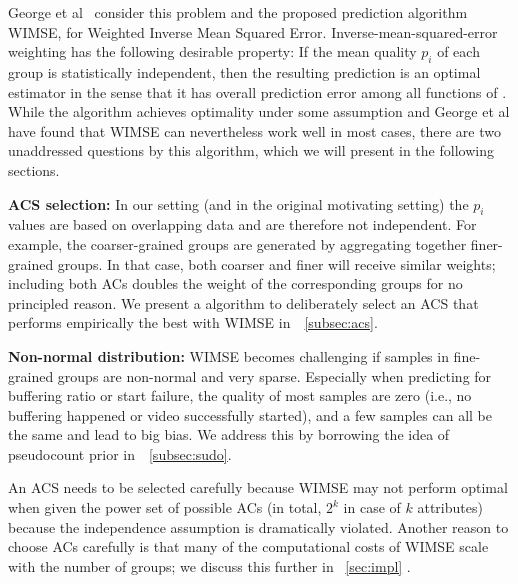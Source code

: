 George et al~\cite{george2008value} consider this problem and the proposed prediction algorithm WIMSE, for Weighted Inverse Mean Squared Error.  Inverse-mean-squared-error weighting has the following desirable property: If the mean quality $p_i$ of each group is statistically independent, then the resulting prediction is an optimal estimator in the sense that it has overall prediction error among all functions of \cite{george2008value}.
While the algorithm achieves optimality under some assumption and George et al have found that WIMSE can nevertheless work well in most cases, there are two unaddressed questions by this algorithm, which we will present in the following sections.
\begin{packeditemize}
	\item {\bf ACS selection:} In our setting (and in the original motivating setting) the $p_i$ values are based on overlapping data and are therefore not independent. For example, the coarser-grained groups are generated by aggregating together finer-grained groups. In that case, both coarser and finer will receive similar weights; including both ACs doubles the weight of the corresponding groups for no principled reason. We present a algorithm to deliberately select an ACS that performs empirically the best with WIMSE in~\Section~\ref{subsec:acs}.
	\item {\bf Non-normal distribution:}  WIMSE becomes challenging if samples in fine-grained groups are non-normal and very sparse. Especially when predicting for buffering ratio or start failure, the quality of most samples are zero (i.e., no buffering happened or video successfully started), and a  few samples can all be the same and lead to big bias.  We address this by borrowing the idea of pseudocount prior in~\Section~\ref{subsec:sudo}.
\end{packeditemize}

\label{subsec:acs}
An ACS needs to be selected carefully because WIMSE may not perform optimal when given the power set of possible ACs (in total, $2^k$ in case of $k$ attributes) because the independence assumption is dramatically violated.  %
 Another reason to choose ACs carefully is that many of the computational costs of WIMSE scale with the number of groups; we discuss this further in \Section~\ref{sec:impl} .

